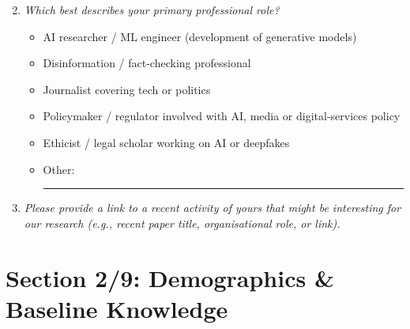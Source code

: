 \begin{enumerate}[label=\textbf{Q\arabic*.}, leftmargin=3em]
\setcounter{enumi}{1}

    \item[*] \textit{Which best describes your primary professional role?}
    \begin{itemize}
        \item[$\bigcirc$] AI researcher / ML engineer (development of generative models)
        \item[$\bigcirc$] Disinformation / fact-checking professional
        \item[$\bigcirc$] Journalist covering tech or politics
        \item[$\bigcirc$] Policymaker / regulator involved with AI, media or digital-services policy
        \item[$\bigcirc$] Ethicist / legal scholar working on AI or deepfakes
        \item[$\bigcirc$] Other: \rule{5cm}{0.4pt}
    \end{itemize}

    \item[*] \textit{Please provide a link to a recent activity of yours that might be interesting for our research (e.g., recent paper title, organisational role, or link).}\\[2pt]
    \framebox[\linewidth]{\rule{0pt}{1em}}

\end{enumerate}

\section*{Section 2/9: Demographics \& Baseline Knowledge}

